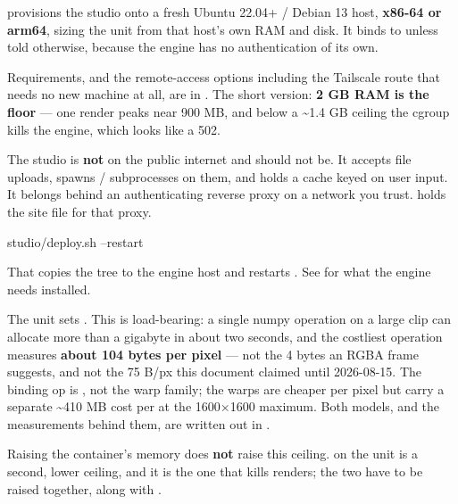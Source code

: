 \documentclass[fontpath=fonts/,logopath=logo/]{riposte-doc}
\begin{document}
 provisions the studio onto a fresh Ubuntu 22.04+ / Debian 13 host, \textbf{x86-64 or arm64}, sizing the unit from that host's own RAM and disk. It binds to  unless told otherwise, because the engine has no authentication of its own.

Requirements, and the remote-access options including the Tailscale route that needs no new machine at all, are in \textbf{}. The short version: \textbf{2 GB RAM is the floor} — one render peaks near 900 MB, and below a \textasciitilde{}1.4 GB ceiling the cgroup kills the engine, which looks like a 502.



The studio is \textbf{not} on the public internet and should not be. It accepts file uploads, spawns / subprocesses on them, and holds a cache keyed on user input. It belongs behind an authenticating reverse proxy on a network you trust.  holds the site file for that proxy.

\ripcodeopen
{}
\begin{ripcodeblock}
studio/deploy.sh --restart
\end{ripcodeblock}
\ripcodesizereset\ripcodeclose

That copies the tree to the engine host and restarts . See  for what the engine needs installed.



The unit sets . This is load-bearing: a single numpy operation on a large clip can allocate more than a gigabyte in about two seconds, and the costliest operation measures \textbf{about 104 bytes per pixel} — not the 4 bytes an RGBA frame suggests, and not the 75 B/px this document claimed until 2026-08-15. The binding op is , not the warp family; the warps are cheaper per pixel but carry a separate \textasciitilde{}410 MB cost per  at the 1600×1600 maximum. Both models, and the measurements behind them, are written out in .

Raising the container's memory does \textbf{not} raise this ceiling.  on the unit is a second, lower ceiling, and it is the one that kills renders; the two have to be raised together, along with .
\end{document}
